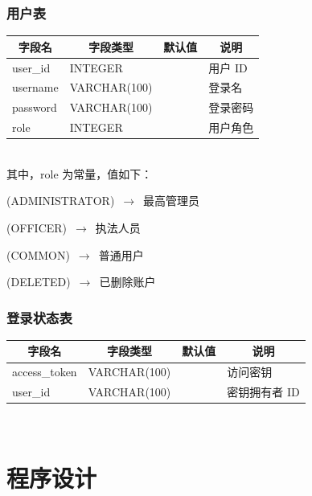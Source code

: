 \documentclass[a4paper, 12pt]{article}
\begin{document}
	\subsubsection{\normalfont 用户表}

	\begin{tabular}{l|l|l|l}
		\toprule
		\multicolumn{1}{c|}{字段名}	& \multicolumn{1}{c|}{字段类型}	& \multicolumn{1}{c|}{默认值}	& \multicolumn{1}{c}{说明} \\
		\midrule
		user\_id						& INTEGER						& 								& 用户 ID \\
		\midrule
		username					& VARCHAR(100)					& 								& 登录名 \\
		\midrule
		password					& VARCHAR(100) 					& 								& 登录密码 \\
		\midrule
		role						& INTEGER						& 								& 用户角色 \\
		\bottomrule
	\end{tabular} \\

	其中，role 为常量，值如下：

	{
		\begin{enumerate} 
		{\setlength{\parskip}{-0.3em}
			\item (ADMINISTRATOR)   $\,\to\,$ 最高管理员
			\item (OFFICER) $\,\to\,$ 执法人员
			\item (COMMON)   $\,\to\,$ 普通用户
			\item (DELETED)       $\,\to\,$ 已删除账户
		}
		\end{enumerate}
	}

	\subsubsection{\normalfont 登录状态表}

	\begin{tabular}{l|l|l|l}
		\toprule
		\multicolumn{1}{c|}{字段名}	& \multicolumn{1}{c|}{字段类型}	& \multicolumn{1}{c|}{默认值}	& \multicolumn{1}{c}{说明} \\
		\midrule
		access\_token				& VARCHAR(100)					& 								& 访问密钥 \\
		\midrule
		user\_id					& VARCHAR(100) 					& 								& 密钥拥有者 ID \\
		\bottomrule
	\end{tabular} \\


	\section{\large\textbf 程序设计}
\end{document}
